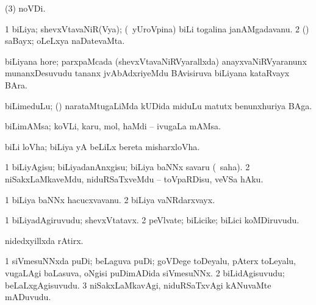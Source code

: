 {{{{{{\bentry
{}
 \gl{\nA}\bmng
{} (\pagu $3$) noVDi. 
\emng
\eentry

\bentry
{} 
\gl{\nA}
\expl{}
\bmng
\bnum
\num{1} biLiya; shevxVtavaNiR(Vya); (\kanmu\ yUroVpina) biLi togalina janAMgadavanu. 
\num{2} (\AmA) saBayx; oLeLxya naDatevaMta. 
\enum
\emng

\noindent
\gl{\pagu}
\expl{}
\bmng
{} biLiyana hore; parxpaMcada (shevxVtavaNiRVyarallxda) anayxvaNiRVyaranunx munanxDesuvudu tananx jvAbAdxriyeMdu BAvisiruva biLiyana kataRvayx BAra. 
\emng
\eentry

\bentry
{}
 \gl{\nA}\bmng
biLimeduLu; (\kanmu) narataMtugaLiMda kUDida miduLu matutx benunxhuriya BAga. 
\emng
\eentry

\bentry
{}
 \gl{\nA}\bmng
biLimAMsa; koVLi, karu, mol, haMdi -- ivugaLa mAMsa. 
\emng
\eentry

\bentry
{}
 \gl{\nA}\bmng
biLi loVha; biLiya yA beLiLx bereta misharxloVha. 
\emng
\eentry

\bentry
{}
 \gl{\nA}\bmng
{} 
\emng
\eentry

\bentry
{}
  \gl{\sakirx}\bmng
\bnum
\num{1} biLiyAgisu; biLiyadanAnxgisu; biLiya baNNx savaru (\akirx\ saha). 
\num{2} niSakxLaMkaveMdu, niduRSaTxveMdu -- toVpaRDisu, veVSa hAku. 
\enum
\emng
\eentry

\bentry
{}
  \gl{\nA}\bmng
\bnum
\num{1} biLiya baNNx hacucxvavanu. 
\num{2} biLiya vaNRdarxvayx. 
\enum
\emng
\eentry

\bentry
{}
  \gl{\nA}\bmng
\bnum
\num{1} biLiyadAgiruvudu; shevxVtatavx. 
\num{2} peVlvate; biLicike; biLici koMDiruvudu. 
\enum
\emng
\eentry

\bentry
{}
 \gl{\nA}\bmng
nidedxyillxda rAtirx. 
\emng
\eentry

\bentry
{}
  \gl{\nA}\bmng
\bnum
\num{1} siVmesuNNxda puDi; beLaguva puDi; goVDege toDeyalu, pAterx toLeyalu, \mo vugaLAgi baLasuva, oNgisi puDimADida siVmesuNNx. 
\num{2} biLidAgisuvudu; beLaLxgAgisuvudu. 
\num{3} niSakxLaMkavAgi, niduRSaTxvAgi kANuvaMte mADuvudu. 
\enum
\emng
\eentry

}}}}}}
